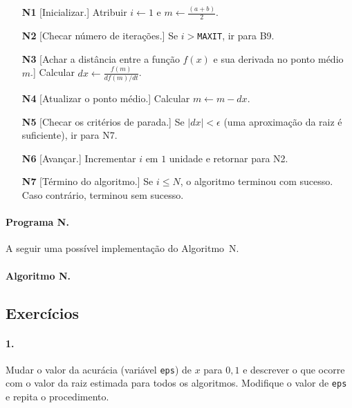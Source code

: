 \begin{itemize}
\item[\bf N1] [Inicializar.] Atribuir $i \leftarrow 1$ e 
	$m\leftarrow\frac{(a+b)}{2}$.
\item[\bf N2] [Checar número de iterações.] Se $i>${\tt MAXIT}, 
		ir para B9.

	\item[\bf N3] [Achar a distância entre a função $f(x)$ e sua derivada no ponto médio $m$.]
		Calcular $dx\leftarrow\frac{f(m)}{df(m)/dt}$.

	\item[\bf N4] [Atualizar o ponto médio.]
	Calcular $m\leftarrow m-dx$.

\item[\bf N5] [Checar os critérios de parada.] Se 
	\hbox{$|dx| < \epsilon$} (uma aproximação da
	raiz é suficiente), ir para N7.

\item[\bf N6] [Avançar.] Incrementar $i$ em $1$ unidade e
	retornar para N2.

\item[\bf N7] [Término do algoritmo.] Se $i\leq N$, o algoritmo
	terminou com sucesso. Caso contrário, terminou 
	sem sucesso.\quad\pfbox
\end{itemize}

\pagebreak

\paragraph{Programa N.} A seguir uma possível implementação 
do Algoritmo~N.

\paragraph{Algoritmo N.}


\subsection*{Exercícios}

\paragraph{1.} Mudar o valor da acurácia (variável {\tt eps}) de $x$ para $0,1$ e
descrever o que ocorre com o valor da raiz estimada para todos 
os algoritmos. Modifique o valor de {\tt eps} e repita o procedimento.

